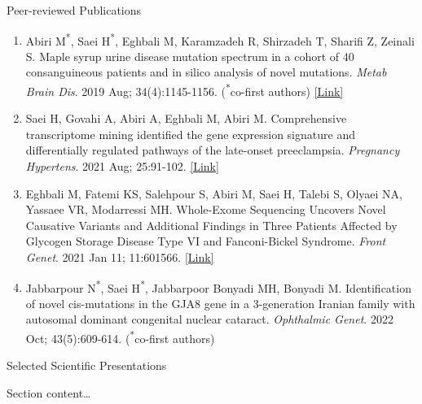 \documentclass[
	11pt, %
]{resume} %
\begin{document}
\begin{rSection}{Peer-reviewed Publications}
\begin{enumerate}
  \item Abiri M\textsuperscript{*}, Saei H\textsuperscript{*}, Eghbali M, Karamzadeh R, Shirzadeh T, Sharifi Z, Zeinali S. 
  Maple syrup urine disease mutation spectrum in a cohort of 40 consanguineous patients and in silico analysis of novel mutations. 
  \textit{Metab Brain Dis}. 2019 Aug; 34(4):1145-1156. (\textsuperscript{*}co-first authors) \href{https://link.springer.com/article/10.1007/s11011-019-00435-y}{[Link]}

  \item Saei H, Govahi A, Abiri A, Eghbali M, Abiri M. Comprehensive transcriptome mining identified the gene
  expression signature and differentially regulated pathways of the late-onset preeclampsia. 
  \textit{Pregnancy Hypertens}. 2021 Aug; 25:91-102. \href{https://www.sciencedirect.com/science/article/abs/pii/S2210778921000386?via%3Dihub}{[Link]}

  \item Eghbali M, Fatemi KS, Salehpour S, Abiri M, Saei H, Talebi S, Olyaei NA, Yassaee VR, Modarressi MH. 
  Whole-Exome Sequencing Uncovers Novel Causative Variants and Additional Findings in Three Patients Affected by
  Glycogen Storage Disease Type VI and Fanconi-Bickel Syndrome. 
  \textit{Front Genet}. 2021 Jan 11; 11:601566. \href{https://www.frontiersin.org/journals/genetics/articles/10.3389/fgene.2020.601566/full}{[Link]}

  \item Jabbarpour N\textsuperscript{*}, Saei H\textsuperscript{*}, Jabbarpoor Bonyadi MH, Bonyadi M. 
  Identification of novel cis-mutations in the GJA8 gene in a 3-generation Iranian family with autosomal dominant congenital nuclear cataract. 
  \textit{Ophthalmic Genet}. 2022 Oct; 43(5):609-614. (\textsuperscript{*}co-first authors)
\end{enumerate}

\end{rSection}




\begin{rSection}{Selected Scientific Presentations}

	Section content\ldots

\end{rSection}
\end{document}
